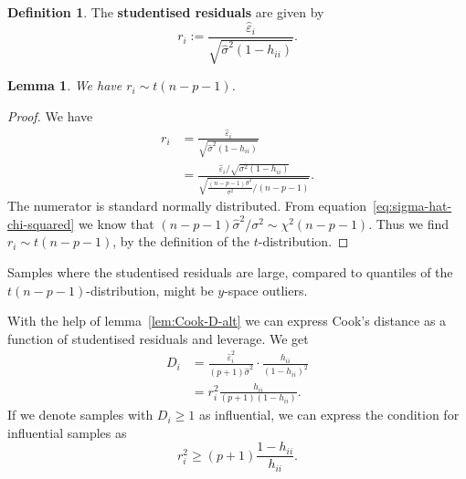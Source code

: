 \documentclass[
  a4paper,
]{article}
\newtheorem{lemma}{Lemma}[section]
\theoremstyle{definition}
\newtheorem{definition}{Definition}[section]
\theoremstyle{definition}
\theoremstyle{definition}
\theoremstyle{definition}
\theoremstyle{remark}
\begin{document}
\begin{definition}
The \textbf{studentised residuals} are given by
\begin{equation*}
  r_i
  := \frac{\hat\varepsilon_i}{\sqrt{\hat\sigma^2 (1-h_{ii})}}.
\end{equation*}
\end{definition}

\begin{lemma}
We have \(r_i \sim t(n-p-1)\).
\end{lemma}

\begin{proof}
We have
\begin{align*}
  r_i
  &= \frac{\hat\varepsilon_i}{\sqrt{\hat\sigma^2 (1-h_{ii})}} \\
  &= \frac{\hat\varepsilon_i / \sqrt{\sigma^2(1-h_{ii})}}{\sqrt{\frac{(n - p - 1)\hat\sigma^2}{\sigma^2}/(n-p-1)}}.
\end{align*}
The numerator is standard normally distributed.
From equation~\eqref{eq:sigma-hat-chi-squared} we know that
\((n - p - 1)\hat\sigma^2 / \sigma^2 \sim \chi^2(n - p - 1)\). Thus
we find \(r_i \sim t(n-p-1)\), by the definition of the \(t\)-distribution.
\end{proof}

Samples where the studentised residuals are large, compared to quantiles
of the \(t(n-p-1)\)-distribution, might be \(y\)-space outliers.

With the help of lemma~\ref{lem:Cook-D-alt} we can express Cook's
distance as a function of studentised residuals and leverage. We get
\begin{align*}
  D_i
  &= \frac{\hat\varepsilon_i^2}{(p+1)\hat\sigma^2} \cdot \frac{h_{ii}}{(1-h_{ii})^2} \\
  &= r_i^2 \frac{h_{ii}}{(p+1)(1-h_{ii})}.
\end{align*}
If we denote samples with \(D_i \geq 1\) as influential, we can express the
condition for influential samples as
\begin{equation*}
  r_i^2 \geq (p+1) \frac{1-h_{ii}}{h_{ii}}.
\end{equation*}
\end{document}
